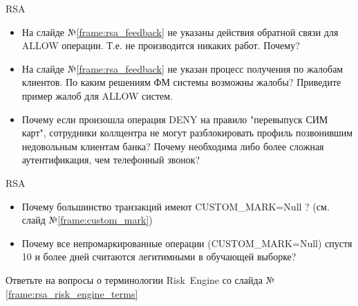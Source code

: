 \begin{frame}{RSA}
	\begin{itemize}
		\item На слайде №\ref{frame:rsa_feedback} не указаны действия
		обратной связи для ALLOW операции. Т.е. не производится никаких работ. 
		Почему?
		\item На слайде №\ref{frame:rsa_feedback} не указан процесс получения 
		по жалобам клиентов. По каким решениям ФМ системы возможны жалобы? 
		Приведите пример жалоб для ALLOW систем. 
		\item Почему если произошла операция DENY на правило "перевыпуск СИМ карт", 
		сотрудники коллцентра не могут разблокировать профиль позвонившим
		недовольным клиентам банка? Почему необходима либо более сложная аутентификация, чем 
		телефонный звонок?
	\end{itemize}
\end{frame}

\begin{frame}{RSA}
\begin{itemize}
	\item Почему большинство транзакций имеют CUSTOM\_MARK=Null ?
	(см. слайд №\ref{frame:custom_mark})
	\item Почему все непромаркированные операции (CUSTOM\_MARK=Null) спустя 10 и более дней считаются 
	легитимными в обучающей выборке?
\end{itemize}
\end{frame}

\begin{frame}
	\Large
	Ответьте на вопросы о терминологии \mbox{Risk Engine}
	со слайда №\ref{frame:rsa_risk_engine_terms}
\end{frame}

